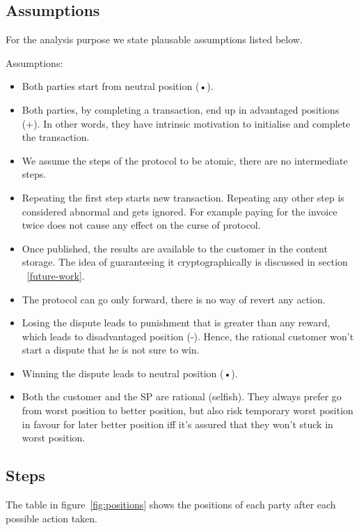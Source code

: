 \documentclass{ieeeaccess}
\begin{document}
\subsection{Assumptions}\label{assumptions}

For the analysis purpose we state plausable assumptions listed below.

Assumptions:

\begin{itemize}

\item
  Both parties start from neutral position (•).
\item
  Both parties, by completing a transaction, end up in advantaged positions (+). In other words, they have intrinsic motivation to initialise and complete the transaction.
\item
  We assume the steps of the protocol to be atomic, there are no intermediate steps.
\item
  Repeating the first step starts new transaction. Repeating any other step is considered abnormal and gets ignored. For example paying for the invoice twice does not cause any effect on the curse of protocol.
\item
  Once published, the results are available to the customer in the content storage. The idea of guaranteeing it cryptographically is discussed in section ~\ref{future-work}.
\item
  The protocol can go only forward, there is no way of revert any action.
\item
  Losing the dispute leads to punishment that is greater than any reward, which leads to disadvantaged position (-). Hence, the rational customer won't start a dispute that he is not sure to win.
\item
  Winning the dispute leads to neutral position (•).
\item
  Both the customer and the SP are rational (selfish). They always prefer go from worst position to better position, but also risk temporary worst position in favour for later better position iff it's assured that they won't stuck in worst position.
\end{itemize}

\subsection{Steps}\label{steps}

The table in figure~\ref{fig:positions} shows the positions of each party after each possible action taken.
\end{document}
